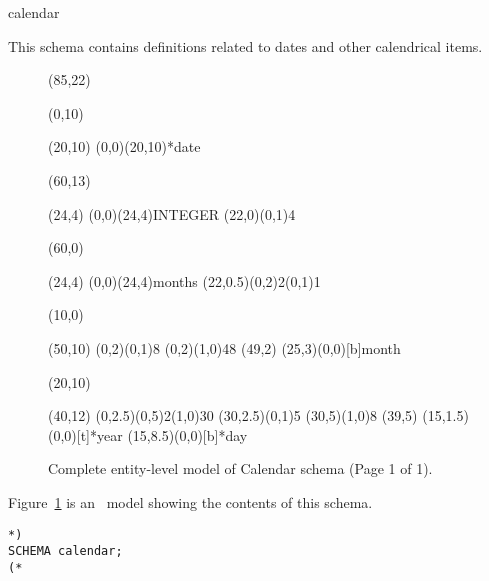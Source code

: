 \documentclass{article}
\begin{document}
\begin{Mnamedesc}{calendar}
\begin{Mdesctext}
This schema contains definitions related to dates and other calendrical items.

%
\begin{figure}[tbp]
\center
\setlength{\unitlength}{1mm}
\begin{picture}(85,22)
\thicklines

\put(0,10){\begin{picture}(20,10)
  \put(0,0){\framebox(20,10){*date}}
  \end{picture}}

\put(60,13){\begin{picture}(24,4)
  \put(0,0){\framebox(24,4){INTEGER}}
  \put(22,0){\line(0,1){4}}
  \end{picture}}

\put(60,0){\begin{picture}(24,4)
  \put(0,0){(24,4){months}}
  \multiput(22,0.5)(0,2){2}{\line(0,1){1}}
  \end{picture}}

\put(10,0){\begin{picture}(50,10)
  \put(0,2){\line(0,1){8}}
  \put(0,2){\line(1,0){48}}
  \put(49,2){}
  \put(25,3){\makebox(0,0)[b]{month}}
  \end{picture}}

\put(20,10){\begin{picture}(40,12)
  \multiput(0,2.5)(0,5){2}{\line(1,0){30}}
  \put(30,2.5){\line(0,1){5}}
  \put(30,5){\line(1,0){8}}
  \put(39,5){}
  \put(15,1.5){\makebox(0,0)[t]{*year}}
  \put(15,8.5){\makebox(0,0)[b]{*day}}
  \end{picture}}

\end{picture}
\setlength{\unitlength}{1pt}
\caption{Complete entity-level model of Calendar schema (Page 1 of 1).}
\label{fig:cargcal}
\end{figure}


    Figure~\ref{fig:cargcal} is an \ExpressG\ model showing the contents
of this schema.

\end{Mdesctext}

\begin{Mexp}
\begin{verbatim}
*)
SCHEMA calendar;
(*
\end{verbatim}
\end{Mexp}
\end{Mnamedesc}
\end{document}
